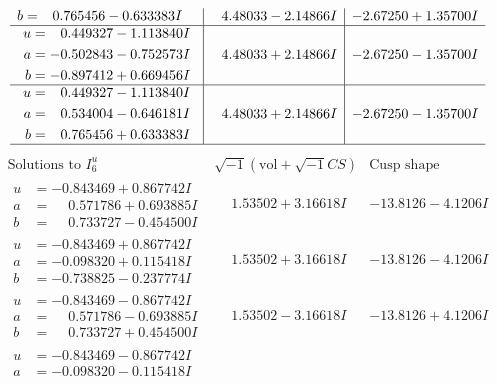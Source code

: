 \documentclass[1p]{elsarticle_modified}
\theoremstyle{definition}
\newcommand{\I}{\sqrt{-1}}
\begin{document}
$$\begin{array}{c|c|c}
\begin{aligned}
b &= \phantom{-}0.765456 - 0.633383 I\end{aligned}
 & \phantom{-}4.48033 - 2.14866 I & -2.67250 + 1.35700 I \\ \hline\begin{aligned}
u &= \phantom{-}0.449327 - 1.113840 I \\
a &= -0.502843 - 0.752573 I \\
b &= -0.897412 + 0.669456 I\end{aligned}
 & \phantom{-}4.48033 + 2.14866 I & -2.67250 - 1.35700 I \\ \hline\begin{aligned}
u &= \phantom{-}0.449327 - 1.113840 I \\
a &= \phantom{-}0.534004 - 0.646181 I \\
b &= \phantom{-}0.765456 + 0.633383 I\end{aligned}
 & \phantom{-}4.48033 + 2.14866 I & -2.67250 - 1.35700 I\\
 \hline 
 \end{array}$$\newpage$$\begin{array}{c|c|c}  
\text{Solutions to }I^u_{6}& \I (\text{vol} + \sqrt{-1}CS) & \text{Cusp shape}\\
 \hline 
\begin{aligned}
u &= -0.843469 + 0.867742 I \\
a &= \phantom{-}0.571786 + 0.693885 I \\
b &= \phantom{-}0.733727 - 0.454500 I\end{aligned}
 & \phantom{-}1.53502 + 3.16618 I & -13.8126 - 4.1206 I \\ \hline\begin{aligned}
u &= -0.843469 + 0.867742 I \\
a &= -0.098320 + 0.115418 I \\
b &= -0.738825 - 0.237774 I\end{aligned}
 & \phantom{-}1.53502 + 3.16618 I & -13.8126 - 4.1206 I \\ \hline\begin{aligned}
u &= -0.843469 - 0.867742 I \\
a &= \phantom{-}0.571786 - 0.693885 I \\
b &= \phantom{-}0.733727 + 0.454500 I\end{aligned}
 & \phantom{-}1.53502 - 3.16618 I & -13.8126 + 4.1206 I \\ \hline\begin{aligned}
u &= -0.843469 - 0.867742 I \\
a &= -0.098320 - 0.115418 I \\

\end{aligned}
\end{array}$$
\end{document}
